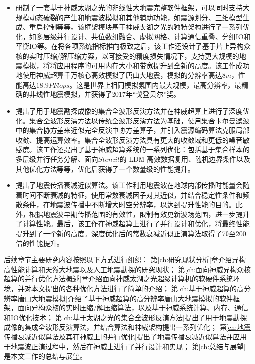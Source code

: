 \documentclass[degree=doctor]{thuthesis}
\begin{document}
\begin{itemize}
  \item 研制了一套基于神威太湖之光的非线性大地震完整软件框架，可以同时支持大规模动态破裂的产生和地震波模拟和其他辅助功能，如震源划分、三维模型生成、重启控制等等。该框架模块基于神威太湖之光的独特架构进行了一系列优化，如多层级并行设计、共位数组融合、虚拟网格、计算通信重叠、分组IO和平衡IO等。在将各项系统指标推向极致之后，该工作还设计了基于片上异构众核的实时压缩/解压缩方案，以可接受的精度损失情况下，支持更大规模的地震模拟，将将应用程序的可用内存大小和带宽提升到全新的高度。该工作成功地使用神威超算千万核心高效模拟了唐山大地震，模拟的分辨率高达$8m$，性能高达$18.9PFlops$。这是世界上相同模拟氛围内最大规模，最高分辨率，最精确的非线性地震模拟，并获得了2017年“戈登贝尔”奖。

  \item 提出了用于地震勘探成像的集合全波形反演方法并在神威超算上进行了深度优化。集合全波形反演方法以传统全波形反演方法为基础，使用集合卡尔曼滤波中的集合协方差来近似完全反演中协方差算子，并引入震源编码算法克服局部收敛、提高运算效率。集合全波形反演方法具有更大的收敛域和更低的噪音敏感度。该工作还提出了基于神威超算系统的一系列优化：包括基于集合样本的多层级并行任务分解、面向$Stencil$的 LDM 高效数据复用、随机边界条件以及其他优化方法等等，优化后获得了一个数量级的性能提升。

  \item 提出了地震传播衰减近似算法。该工作利用地震波在地球内部传播时能量会随着时间不断衰减的特征，使用常数衰减因子对其近似，并结合稳定性条件和频散条件，在地震波传播中不断增大时空分辨率，以达到提升性能的目的。此外，根据地震波早期传播范围的有效性，限制有效更新波场范围，进一步提升了计算性能。最后，该工作在神威超算上进行了并行设计和优化，将最终性能提升到了一个新的高度。深度优化后的常数衰减近似正演算法取得了70至200倍的性能提升。

\end{itemize}

后续章节主要研究内容按照以下方式进行组织：
第\ref{ch:研究现状分析}章介绍异构高性能计算和天然大地震以及人工地震勘探的研究现状；
第\ref{ch:面向神威异构众核超算的并行优化方法概述}章介绍面向神威太湖之光超级计算机的软硬件系统环境，并对本文提出的各种优化方法进行了简单的介绍；
第\ref{ch:基于神威超算的高分辨率唐山大地震模拟}介绍了基于神威超算的高分辨率唐山大地震模拟的软件框架，面向异构众核的实时压缩/解压缩算法，以及基于神威系统计算、内存、通信和IO优化技术；
第\ref{ch:基于太湖之光的集合全波形反演方法}提出了用于地震勘探成像的集成全波形反演算法，并结合算法和神威架构提出一系列优化；
第\ref{ch:地震传播衰减近似算法及其在神威上的并行优化}提出了地震传播衰减近似算法并应用于地震波正演过程中，然后在神威上进行了并行设计和实现；
第\ref{ch:总结与展望}是本文工作的总结与展望。
\end{document}
